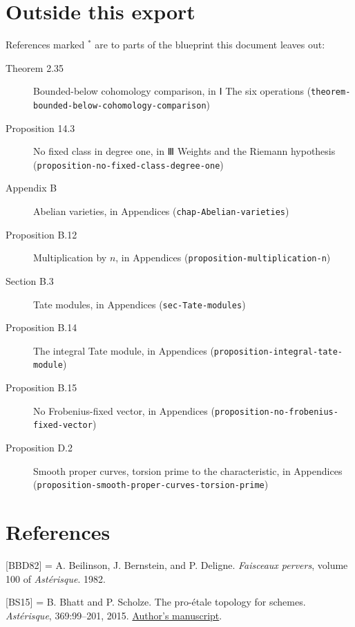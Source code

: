 \documentclass[11pt]{article}
\newcommand{\bpslug}[1]{\texttt{#1}}
\newcommand{\bpbibitem}[3]{\par\setbox0\hbox{[#1]\enspace}\ifdim\wd0<5em\setbox0\hbox to 5em{[#1]\hfil}\fi
  \hangindent=\wd0 \hangafter=1 \noindent\box0\phantomsection\label{#2}#3\par\smallskip}
\begin{document}
\clearpage{}\hypertarget{bp-outside}{}%
\section*{Outside this export}
References marked \ensuremath{{}^\ast} are to parts of the blueprint this document leaves out:
\begin{description}
\item[Theorem 2.35] Bounded-below cohomology comparison, in Ⅰ The six operations (\bpslug{theorem-{}\allowbreak{}bounded-{}\allowbreak{}below-{}\allowbreak{}cohomology-{}\allowbreak{}comparison})
\item[Proposition 14.3] No fixed class in degree one, in Ⅲ Weights and the Riemann hypothesis (\bpslug{proposition-{}\allowbreak{}no-{}\allowbreak{}fixed-{}\allowbreak{}class-{}\allowbreak{}degree-{}\allowbreak{}one})
\item[Appendix B] Abelian varieties, in Appendices (\bpslug{chap-{}\allowbreak{}Abelian-{}\allowbreak{}varieties})
\item[Proposition B.12] Multiplication by $n$, in Appendices (\bpslug{proposition-{}\allowbreak{}multiplication-{}\allowbreak{}n})
\item[Section B.3] Tate modules, in Appendices (\bpslug{sec-{}\allowbreak{}Tate-{}\allowbreak{}modules})
\item[Proposition B.14] The integral Tate module, in Appendices (\bpslug{proposition-{}\allowbreak{}integral-{}\allowbreak{}tate-{}\allowbreak{}module})
\item[Proposition B.15] No Frobenius-fixed vector, in Appendices (\bpslug{proposition-{}\allowbreak{}no-{}\allowbreak{}frobenius-{}\allowbreak{}fixed-{}\allowbreak{}vector})
\item[Proposition D.2] Smooth proper curves, torsion prime to the characteristic, in Appendices (\bpslug{proposition-{}\allowbreak{}smooth-{}\allowbreak{}proper-{}\allowbreak{}curves-{}\allowbreak{}torsion-{}\allowbreak{}prime})
\end{description}
\clearpage{}%
\section*{References}
\bpbibitem{BBD82}{bp55}{A. Beilinson, J. Bernstein, and P. Deligne. \emph{Faisceaux pervers}, volume 100 of \emph{Astérisque}. 1982.}

\bpbibitem{BS15}{bp56}{B. Bhatt and P. Scholze. The pro-étale topology for schemes. \emph{Astérisque}, 369:99–201, 2015. \href{https://people.mpim-bonn.mpg.de/scholze/proetale.pdf}{Author's manuscript}.}
\end{document}

